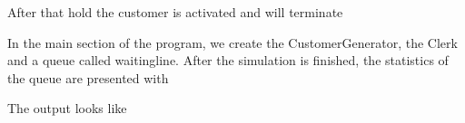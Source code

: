 \documentclass[letterpaper,10pt,english]{sphinxmanual}
\begin{document}
After that hold the customer is activated and will terminate

%
\begin{sphinxVerbatim}[commandchars=\\\{\}]
\end{sphinxVerbatim}

In the main section of the program, we create the CustomerGenerator, the Clerk and a queue called waitingline.
After the simulation is finished, the statistics of the queue are presented with

%
\begin{sphinxVerbatim}[commandchars=\\\{\}]
\end{sphinxVerbatim}

The output looks like
\end{document}
